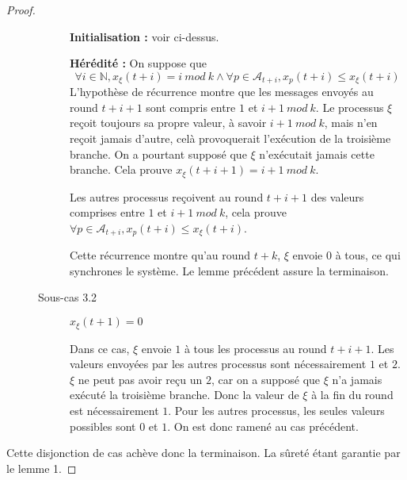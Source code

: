 \documentclass{article}
\begin{document}
\begin{proof}
\begin{description}
\begin{description}
					\textbf{Initialisation : } voir ci-dessus.

					\textbf{Hérédité : } On suppose que 
					$$\forall i \in \mathds{N}, x_\xi(t+i) = i~mod~k \wedge \forall p \in \mathcal{A}_{t+i}, x_p(t+i) \leq x_\xi(t+i)$$
					L'hypothèse de récurrence montre que les messages envoyés au round $t+i+1$ sont compris entre $1$ et $i+1~mod~k$.
					Le processus $\xi$ reçoit toujours sa propre valeur, à savoir $i+1~mod~k$, mais n'en reçoit jamais d'autre, celà provoquerait l'exécution de la troisième branche.
					On a pourtant supposé que $\xi$ n'exécutait jamais cette branche. Cela prouve $x_\xi(t+i+1) = i+1~mod~k$.

					Les autres processus reçoivent au round $t+i+1$ des valeurs comprises entre $1$ et $i+1~mod~k$, cela prouve $\forall p \in \mathcal{A}_{t+i}, x_p(t+i) \leq x_\xi(t+i)$.

					Cette récurrence montre qu'au round $t+k$, $\xi$ envoie $0$ à tous, ce qui synchrones le système. Le lemme précédent assure la terminaison.

				\item[Sous-cas 3.2] $x_\xi(t+1) = 0$

					Dans ce cas, $\xi$ envoie $1$ à tous les processus au round $t+i+1$. Les valeurs envoyées par les autres processus sont nécessairement $1$ et $2$.
					$\xi$ ne peut pas avoir reçu un $2$, car on a supposé que $\xi$ n'a jamais exécuté la troisième branche. Donc la valeur de $\xi$ à la fin du round est nécessairement $1$.
					Pour les autres processus, les seules valeurs possibles sont $0$ et $1$. On est donc ramené au cas précédent.
			\end{description}
	\end{description}

	Cette disjonction de cas achève donc la terminaison. La sûreté étant garantie par le lemme 1.
\end{proof}
\end{document}
